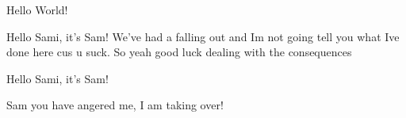 \documentclass[10pt,a4paper]{article}
\begin{document}
Hello World!

Hello Sami, it's Sam! We've had a falling out and Im not going tell you what Ive done here cus u suck. So yeah good luck dealing with the consequences

Hello Sami, it's Sam! 

Sam you have angered me, I am taking over!
\end{document}
